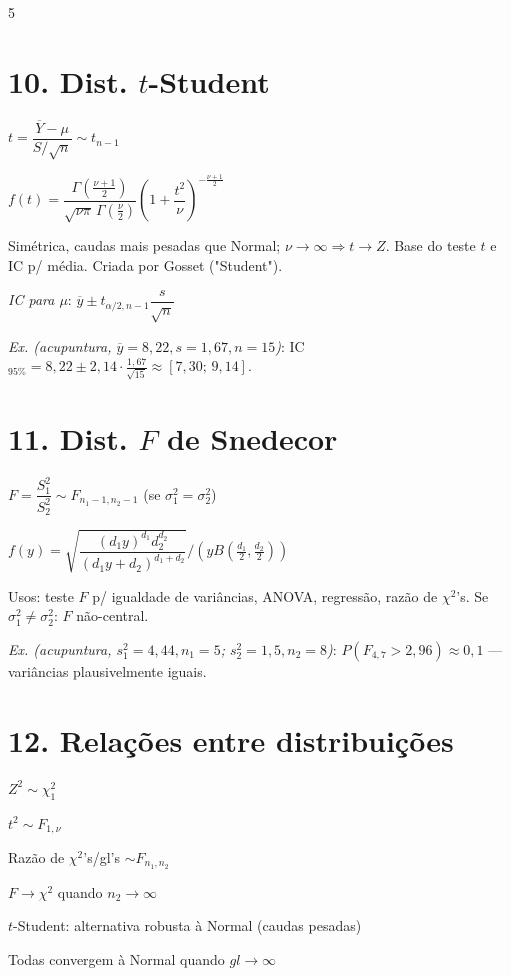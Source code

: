 \documentclass[7pt,landscape,a4paper]{extarticle}
\begin{document}
\begin{multicols*}{5}
\section{10. Dist. $t$-Student}
$t=\dfrac{\overline{Y}-\mu}{S/\sqrt n}\sim t_{n-1}$

$f(t)=\dfrac{\Gamma(\frac{\nu+1}{2})}{\sqrt{\nu\pi}\,\Gamma(\frac{\nu}{2})}\left(1+\dfrac{t^2}{\nu}\right)^{-\frac{\nu+1}{2}}$

Simétrica, caudas mais pesadas que Normal; $\nu\to\infty \Rightarrow t\to Z$. Base do teste $t$ e IC p/ média. Criada por Gosset ("Student").

\textit{IC para $\mu$}: $\overline y\pm t_{\alpha/2,n-1}\dfrac{s}{\sqrt n}$

\textit{Ex. (acupuntura, $\overline y{=}8{,}22,s{=}1{,}67,n{=}15$)}: IC$_{95\%}=8{,}22\pm2{,}14\cdot\frac{1{,}67}{\sqrt{15}}\approx[7{,}30;\,9{,}14]$.

\section{11. Dist. $F$ de Snedecor}
$F=\dfrac{S_1^2}{S_2^2}\sim F_{n_1-1,n_2-1}$ (se $\sigma_1^2=\sigma_2^2$)

$f(y)=\sqrt{\dfrac{(d_1y)^{d_1}d_2^{d_2}}{(d_1y+d_2)^{d_1+d_2}}}\Big/\left(yB(\tfrac{d_1}{2},\tfrac{d_2}{2})\right)$

Usos: teste $F$ p/ igualdade de variâncias, ANOVA, regressão, razão de $\chi^2$'s. Se $\sigma_1^2\neq\sigma_2^2$: $F$ não-central.

\textit{Ex. (acupuntura, $s_1^2{=}4{,}44,n_1{=}5$; $s_2^2{=}1{,}5,n_2{=}8$)}: $P(F_{4,7}>2{,}96)\approx0{,}1$ — variâncias plausivelmente iguais.

\section{12. Relações entre distribuições}
$Z^2\sim\chi^2_1$

$t^2\sim F_{1,\nu}$

Razão de $\chi^2$'s/gl's $\sim F_{n_1,n_2}$

$F\to\chi^2$ quando $n_2\to\infty$

$t$-Student: alternativa robusta à Normal (caudas pesadas)

Todas convergem à Normal quando $gl\to\infty$

\end{multicols*}
\end{document}
